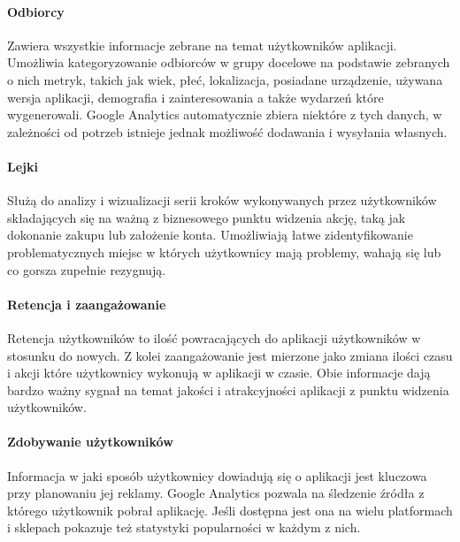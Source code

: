 \paragraph{Odbiorcy}
Zawiera wszystkie informacje zebrane na temat użytkowników aplikacji. Umożliwia kategoryzowanie odbiorców w grupy docelowe na podstawie zebranych o nich metryk, takich jak wiek, płeć, lokalizacja, posiadane urządzenie, używana wersja aplikacji, demografia i zainteresowania a także wydarzeń które wygenerowali. Google Analytics automatycznie zbiera niektóre z tych danych, w zależności od potrzeb istnieje jednak możliwość dodawania i wysyłania własnych.

\paragraph{Lejki}
Służą do analizy i wizualizacji serii kroków wykonywanych przez użytkowników składających się na ważną z biznesowego punktu widzenia akcję, taką jak dokonanie zakupu lub założenie konta. Umożliwiają łatwe zidentyfikowanie problematycznych miejsc w których użytkownicy mają problemy, wahają się lub co gorsza  zupełnie rezygnują.

\paragraph{Retencja i zaangażowanie} 
Retencja użytkowników to ilość powracających do aplikacji użytkowników w stosunku do nowych. Z kolei zaangażowanie jest mierzone jako zmiana ilości czasu i akcji które użytkownicy wykonują w aplikacji w czasie. Obie informacje dają bardzo ważny sygnał na temat jakości i atrakcyjności aplikacji z punktu widzenia użytkowników.

\paragraph{Zdobywanie użytkowników}
Informacja w jaki sposób użytkownicy dowiadują się o aplikacji jest kluczowa przy planowaniu jej reklamy. Google Analytics pozwala na śledzenie źródła z którego użytkownik pobrał aplikację. Jeśli dostępna jest ona na wielu platformach i sklepach pokazuje też statystyki popularności w każdym z nich.
